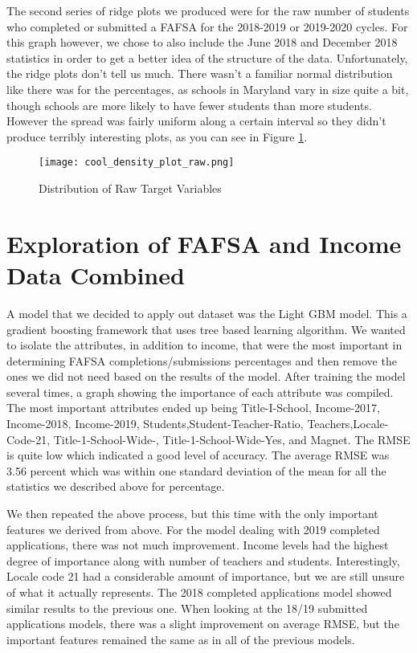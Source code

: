 \documentclass[12pt]{article}
\begin{document}
The second series of ridge plots we produced were for the raw number of students
who completed or submitted a FAFSA for the 2018-2019 or 2019-2020 cycles. For this
graph however, we chose to also include the June 2018 and December 2018 statistics
in order to get a better idea of the structure of the data. Unfortunately, the ridge
plots don't tell us much. There wasn't a familiar normal distribution like there was
for the percentages, as schools in Maryland vary in size quite a bit, though schools
are more likely to have fewer students than more students. However the spread was
fairly uniform along a certain interval so they didn't produce terribly interesting
plots, as you can see in Figure \ref{fig:target_raw}.

\begin{figure}[!htb]
  \centering
  \texttt{[image: cool\_density\_plot\_raw.png]}
  \caption{Distribution of Raw Target Variables}
  \label{fig:target_raw}
\end{figure}

\section{Exploration of FAFSA and Income Data Combined}
A model that we decided to apply out dataset was the Light GBM model. This a gradient boosting framework that uses tree based learning algorithm. We wanted to isolate the attributes, in addition to income, that were the most important in determining FAFSA completions/submissions percentages and then remove the ones we did not need based on the results of the model. After training the model several times, a graph showing the importance of each attribute was compiled. The most important attributes ended up being Title-I-School, Income-2017, Income-2018, Income-2019, Students,Student-Teacher-Ratio, Teachers,Locale-Code-21, Title-1-School-Wide-, Title-1-School-Wide-Yes, and Magnet. The RMSE is quite low which indicated a good level of accuracy. The average RMSE was 3.56 percent which was within one standard deviation of the mean for all the statistics we described above for percentage.

We then repeated the above process, but this time with the only important features we derived from above. For the model dealing with 2019 completed applications, there was not much improvement. Income levels had the highest degree of importance along with number of teachers and students. Interestingly, Locale code 21 had a considerable amount of importance, but we are still unsure of what it actually represents. The 2018 completed applications model showed similar results to the previous one. When looking at the 18/19 submitted applications models, there was a slight improvement on average RMSE, but the important features remained the same as in all of the previous models.\\
\end{document}
